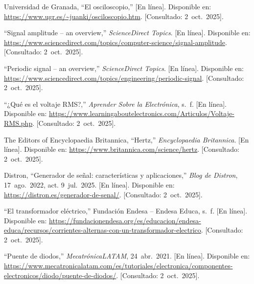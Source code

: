 \documentclass[conference]{IEEEtran} %
\begin{document}
\begin{thebibliography}{00}

Universidad de Granada, ``El osciloscopio,'' [En línea]. Disponible en: \url{https://www.ugr.es/~juanki/osciloscopio.htm}. [Consultado: 2~oct.~2025].

``Signal amplitude -- an overview,'' \emph{ScienceDirect Topics}. [En línea]. Disponible en: \url{https://www.sciencedirect.com/topics/computer-science/signal-amplitude}. [Consultado: 2~oct.~2025].

``Periodic signal -- an overview,'' \emph{ScienceDirect Topics}. [En línea]. Disponible en: \url{https://www.sciencedirect.com/topics/engineering/periodic-signal}. [Consultado: 2~oct.~2025].

``¿Qué es el voltaje RMS?,'' \emph{Aprender Sobre la Electrónica}, s.~f. [En línea]. Disponible en: \url{https://www.learningaboutelectronics.com/Articulos/Voltaje-RMS.php}. [Consultado: 2~oct.~2025].

The Editors of Encyclopaedia Britannica, ``Hertz,'' \emph{Encyclopaedia Britannica}. [En línea]. Disponible en: \url{https://www.britannica.com/science/hertz}. [Consultado: 2~oct.~2025].

Distron, ``Generador de señal: características y aplicaciones,'' \emph{Blog de Distron}, 17~ago.~2022, act. 9~jul.~2025. [En línea]. Disponible en: \url{https://distron.es/generador-de-senal/}. [Consultado: 2~oct.~2025].

``El transformador eléctrico,'' Fundación Endesa -- Endesa Educa, s.~f. [En línea]. Disponible en: \url{https://fundacionendesa.org/es/educacion/endesa-educa/recursos/corrientes-alternas-con-un-transformador-electrico}. [Consultado: 2~oct.~2025].

``Puente de diodos,'' \emph{MecatrónicaLATAM}, 24~abr.~2021. [En línea]. Disponible en: \url{https://www.mecatronicalatam.com/es/tutoriales/electronica/componentes-electronicos/diodo/puente-de-diodos/}. [Consultado: 2~oct.~2025].

\end{thebibliography}

\end{document}
